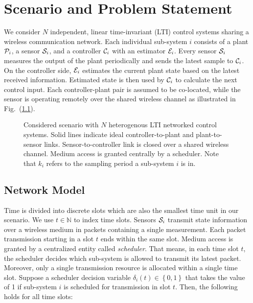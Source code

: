 \chapter{Scenario and Problem Statement}

We consider $N$ independent, linear time-invariant (LTI) control systems sharing
a wireless communication network. Each individual sub-system $i$ consists of a
plant $\mathcal{P}_i$, a sensor $\mathcal{S}_i$, and a controller $\mathcal{C}_i$ with an
estimator $\mathcal{E}_i$. Every sensor $\mathcal{S}_i$ measures the output of the plant
periodically and sends the latest sample to $\mathcal{C}_i$. On the controller
side, $\mathcal{E}_i$ estimates the current plant state based on the latest
received information. Estimated state is then used by $\mathcal{C}_i$ to calculate
the next control input. Each controller-plant pair is assumed to be co-located,
while the sensor is operating remotely over the shared wireless channel as
illustrated in Fig.~(\ref{fig:scenario}).

\begin{figure}[htb]
  \centering
  \resizebox*{.8\columnwidth}{!}{} \caption[Scheme of
  $N$ sub-systems sharing a wireless communication medium]{Considered scenario
  with $N$ heterogenous LTI networked control systems. Solid lines indicate
  ideal controller-to-plant and plant-to-sensor links. Sensor-to-controller link
  is closed over a shared wireless channel. Medium access is granted centrally
  by a scheduler. Note that $k_i$ refers to the sampling period a sub-system $i$
  is in.}
  \label{fig:scenario}
\end{figure}

\section{Network Model}
Time is divided into discrete slots which are also the smallest time unit in our
scenario. We use $t \in \mathbb{N}$ to index time slots. Sensors $\mathcal{S}_i$
transmit state information over a wireless medium in packets containing a single
measurement. Each packet transmission starting in a slot $t$ ends within the
same slot. Medium access is granted by a centralized entity called
\textit{scheduler}. That means, in each time slot $t$, the scheduler decides
which sub-system is allowed to transmit its latest packet. Moreover, only a
single transmission resource is allocated within a single time slot. Suppose a
scheduler decision variable $\delta_i(t) \in \left\{0,1\right\}$ that takes the
value of 1 if sub-system $i$ is scheduled for transmission in slot $t$.
Then, the following holds for all time slots:

